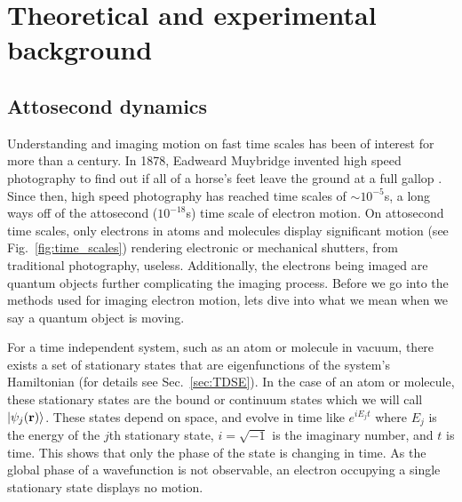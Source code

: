 \chapter{Theoretical and experimental background} %
\label{cha:theoretical_background}
\section{Attosecond dynamics} %
\label{sec:attosecond_dynamics}

Understanding and imaging motion on fast time scales has been of interest for more than a century. In 1878, Eadweard Muybridge invented high speed photography to find out if all of a horse's feet leave the ground at a full gallop \cite{muybridge1978}. Since then, high speed photography has reached time scales of $\sim10^{-5}$s, a long ways off of the attosecond ($10^{-18}$s) time scale of electron motion. On attosecond time scales, only electrons in atoms and molecules display significant motion (see Fig.~\ref{fig:time_scales}) rendering electronic or mechanical shutters, from traditional photography, useless. Additionally, the electrons being imaged are quantum objects further complicating the imaging process. Before we go into the methods used for imaging electron motion, lets dive into what we mean when we say a quantum object is moving. 

For a time independent system, such as an atom or molecule in vacuum, there exists a set of stationary states that are eigenfunctions of the system's Hamiltonian (for details see Sec.~\ref{sec:TDSE}). In the case of an atom or molecule, these stationary states are the bound or continuum states which we will call $\ket{\psi_j(\mathbf{r})}$. These states depend on space, and evolve in time like $e^{iE_j t}$ where $E_j$ is the energy of the $j$th stationary state, $i=\sqrt{-1}$ is the imaginary number, and $t$ is time. This shows that only the phase of the state is changing in time. As the global phase of a wavefunction is not observable, an electron occupying a single stationary state displays no motion. 

